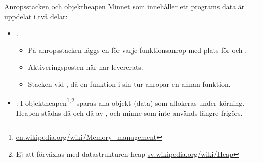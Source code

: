 \begin{Slide}{Anropsstacken och objektheapen}\SlideFontSmall
Minnet som innehåller ett programs data är uppdelat i två delar:
\begin{itemize}
\item {}: 
\begin{itemize}\SlideFontSmall
\item På anropsstacken läggs en   för varje funktionsanrop med plats för  och .
\item Aktiveringsposten  när  har levererats.
\item Stacken  vid , då en funktion i sin tur anropar en annan funktion.
\end{itemize}
\item {}: I objektheapen\footnote{\href{https://en.wikipedia.org/wiki/Memory_management}{en.wikipedia.org/wiki/Memory\_management}}$^{,}$\footnote{Ej att förväxlas med datastrukturen heap  \href{https://sv.wikipedia.org/wiki/Heap}{sv.wikipedia.org/wiki/Heap}} sparas alla objekt (data) som allokeras under körning. Heapen städas då och då av  , och minne som inte används längre frigörs. \\\vspace{0.5em}
\end{itemize}
\end{Slide}

